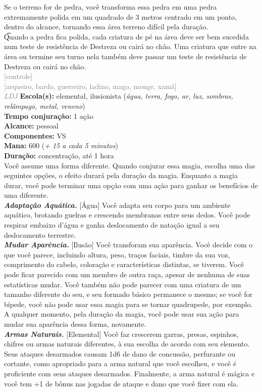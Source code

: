 \documentclass{RPG_Adventure}[2021/10/20]
\begin{document}
{\normalsize Se o terreno for de pedra, você transforma essa pedra em uma pedra extremamente polida em um quadrado de 3 metros centrado em um ponto, dentro do alcance, tornando essa área terreno difícil pela duração.\\\t Quando a pedra fica polida, cada criatura de pé na área deve ser bem sucedida num teste de resistência de Destreza ou cairá no chão. Uma criatura que entre na área ou termine seu turno nela também deve passar um teste de resistência de Destreza ou cairá no chão.\\}
{\scriptsize \textcolor{gray}{[controle]\\}}
{\scriptsize \textcolor{gray}{[arqueiro, bardo, guerreiro, ladino, mago, monge, xamã]\\}}
{\tiny \textcolor{gray}{\textit{LDJ}}}\jump{}
{\small \t \textbf{Escola(s):} elemental, ilusionista (\textit{água, terra, fogo, ar, luz, sombras, relâmpago, metal, veneno})\\\t \textbf{Tempo conjuração:} 1 ação\\\t \textbf{Alcance:} pessoal\\\t \textbf{Componentes:} VS\\\t \textbf{Mana:} 600 (\textit{+ 15 a cada 5 minutos})\\\t \textbf{Duração:} concentração, até 1 hora\\}
{\normalsize Você assume uma forma diferente. Quando conjurar essa magia, escolha uma das seguintes opções, o efeito durará pela duração da magia. Enquanto a magia durar, você pode terminar uma opção com uma ação para ganhar os benefícios de uma diferente.\\\t \textbf{\textit{Adaptação Aquática.}} [Água] Você adapta seu corpo para um ambiente aquático, brotando guelras e crescendo membranas entre seus dedos. Você pode respirar embaixo d’água e ganha deslocamento de natação igual a seu deslocamento terrestre.\\\t \textbf{\textit{Mudar Aparência.}} [Ilusão] Você transforam sua aparência. Você decide com o que você parece, incluindo altura, peso, traços faciais, timbre da sua voz, comprimento do cabelo, coloração e características distintas, se tiverem. Você pode ficar parecido com um membro de outra raça, apesar de nenhuma de suas estatísticas mudar. Você também não pode parecer com uma criatura de um tamanho diferente do seu, e seu formado básico permanece o mesmo; se você for bípede, você não pode usar essa magia para se tornar quadrupede, por exemplo. A qualquer momento, pela duração da magia, você pode usar sua ação para mudar sua aparência dessa forma, novamente.\\\t \textbf{\textit{Armas Naturais.}} [Elemental] Você faz crescerem garras, presas, espinhos, chifres ou armas naturais diferentes, à sua escolha de acordo com seu elemento. Seus ataques desarmados causam 1d6 de dano de concussão, perfurante ou cortante, como apropriado para a arma natural que você escolheu, e você é proficiente com seus ataques desarmados. Finalmente, a arma natural é mágica e você tem +1 de bônus nas jogadas de ataque e dano que você fizer com ela.\\}
\end{document}
